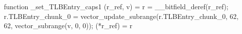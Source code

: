 function _set_TLBEntry_caps1 (r_ref, v) = {
    r = __bitfield_deref(r_ref);
    r.TLBEntry_chunk_0 = vector_update_subrange(r.TLBEntry_chunk_0, 62, 62, vector_subrange(v, 0, 0));
    (*r_ref) = r
}
